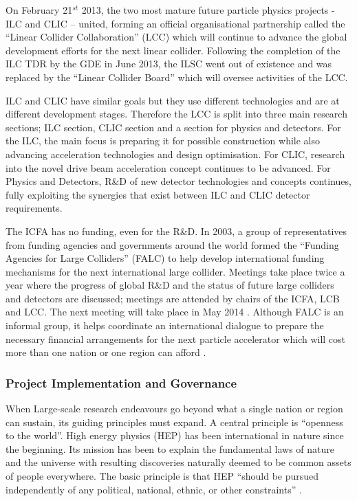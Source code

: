 On February 21$^{st}$ 2013, the two most mature future particle physics projects - ILC and CLIC – united, forming an official organisational partnership called the ``Linear Collider Collaboration'' (LCC) which will continue to advance the global development efforts for the next linear collider. \cite{LCC:Press1} Following the completion of the ILC TDR by the GDE in June 2013, the ILSC went out of existence and was replaced by the ``Linear Collider Board'' which will oversee activities of the LCC.

ILC and CLIC have similar goals but they use different technologies and are at different development stages. Therefore the LCC is split into three main research sections; ILC section, CLIC section and a section for physics and detectors. For the ILC, the main focus is preparing it for possible construction while also advancing acceleration technologies and design optimisation. For CLIC, research into the novel drive beam acceleration concept continues to be advanced.  For Physics and Detectors, R\&D of new detector technologies and concepts continues, fully exploiting the synergies that exist between ILC and CLIC detector requirements. \cite{LCC:Press1}

The ICFA has no funding, even for the R\&D. In 2003, a group of representatives from funding agencies and governments around the world formed the ``Funding Agencies for Large Colliders'' (FALC) to help develop international funding mechanisms for the next international large collider. Meetings take place twice a year where the progress of global R\&D and the status of future large colliders and detectors are discussed; meetings are attended by chairs of the ICFA, LCB and LCC. The next meeting will take place in May 2014 \cite{Funding:FALC:History}. Although FALC is an informal group, it helps coordinate an international dialogue to prepare the necessary financial arrangements for the next particle accelerator which will cost more than one nation or one region can afford \cite{Funding:FALC:Report}.

\subsubsection{Project Implementation and Governance}

When Large-scale research endeavours go beyond what a single nation or region can sustain, its guiding principles must expand. A central principle is ``openness to the world''. High energy physics (HEP) has been international in nature since the beginning. Its mission has been to explain the fundamental laws of nature and the universe with resulting discoveries naturally deemed to be common assets of people everywhere. The basic principle is that HEP ``should be pursued independently of any political, national, ethnic, or other constraints'' \cite{ILC:PIPReport}.

